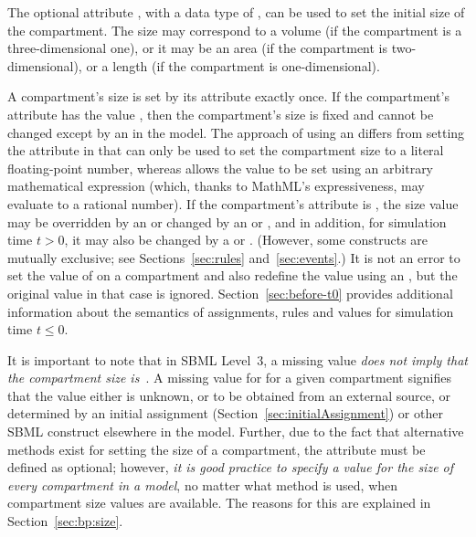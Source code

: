 The optional \Compartment attribute , with a data type
of , can be used to set the initial size of the
compartment.  The size may correspond to a volume (if the
compartment is a three-dimensional one), or it may be an area (if
the compartment is two-dimensional), or a length (if the
compartment is one-dimensional).

A compartment's size is set by its  attribute exactly
once.  If the compartment's attribute  has
the value , then the compartment's size is fixed
and cannot be changed except by an \InitialAssignment in the
model.  The approach of using an \InitialAssignment differs from
setting the  attribute in that  can only
be used to set the compartment size to a literal floating-point
number, whereas \InitialAssignment allows the value to be set
using an arbitrary mathematical expression (which, thanks to
MathML's expressiveness, may evaluate to a rational number).  If
the compartment's  attribute is , the
size value may be overridden by an \InitialAssignment or changed
by an \AssignmentRule or \AlgebraicRule, and in addition, for
simulation time $t > 0$, it may also be changed by a \RateRule or
\Event.  (However, some constructs are mutually exclusive; see
Sections~\ref{sec:rules} and~\ref{sec:events}.)  It is not an
error to set the value of  on a compartment and also
redefine the value using an \InitialAssignment, but the original
 value in that case is ignored.
Section~\ref{sec:before-t0} provides additional information about
the semantics of assignments, rules and values for simulation time
$t \leq 0$.

It is important to note that in SBML Level~3, a missing
 value \emph{does not imply that the compartment size
  is~}.  A missing value for  for a given
compartment signifies that the value either is unknown, or to be
obtained from an external source, or determined by an initial
assignment (Section~\ref{sec:initialAssignment}) or other SBML
construct elsewhere in the model.  Further, due to the fact that
alternative methods exist for setting the size of a
compartment, the  attribute must be defined as
optional; however, \emph{it is good practice to specify a value
for the size of every compartment in a model}, no matter what method
is used, when compartment size values are available.  The reasons
for this are explained in Section~\ref{sec:bp:size}.


